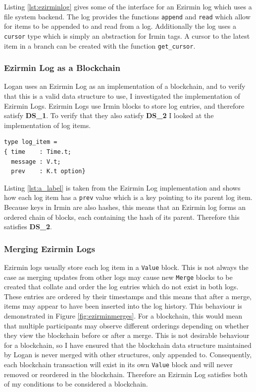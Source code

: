 \documentclass[12pt,a4paper,twoside,openright]{report}
\begin{document}
	Listing \ref{lst:ezirminlog} gives some of the interface for an Ezirmin log which uses a file system backend.
	The log provides the functions \texttt{append} and \texttt{read} which allow for items to be appended to and read from a log.
	Additionally the log uses a \texttt{cursor} type which is simply an abstraction for Irmin tags.
	A cursor to the latest item in a branch can be created with the function \texttt{get\_cursor}.

	\subsubsection*{Ezirmin Log as a Blockchain}
	Logan uses an Ezirmin Log as an implementation of a blockchain, and to verify that this is a valid data structure to use, I investigated the implementation of Ezirmin Logs.
	Ezirmin Logs use Irmin blocks to store log entries, and therefore satisfy \textbf{DS\_1}. 
	To verify that they also satisfy \textbf{DS\_2} I looked at the implementation of log items.\\

	\begin{lstlisting}[caption={Ezirmin Log Item},label={lst:a_label}]
type log_item =
{ time    : Time.t;
  message : V.t;
  prev    : K.t option}
	\end{lstlisting}

	Listing \ref{lst:a_label} is taken from the Ezirmin Log implementation and shows how each log item has a \texttt{prev} value which is a key pointing to its parent log item. 
	Because keys in Irmin are also hashes, this means that an Ezirmin log forms an ordered chain of blocks, each containing the hash of its parent. 
	Therefore this satisfies \textbf{DS\_2}.

	\subsubsection*{Merging Ezirmin Logs}
	Ezirmin logs usually store each log item in a \texttt{Value} block.
	This is not always the case as merging updates from other logs may cause new \texttt{Merge} blocks to be created that collate and order the log entries which do not exist in both logs.
	These entries are ordered by their timestamps and this means that after a merge, items may appear to have been inserted into the log history.
	This behaviour is demonstrated in Figure \ref{fig:ezirminmerges}.
	For a blockchain, this would mean that multiple participants may observe different orderings depending on whether they view the blockchain before or after a merge.
	This is not desirable behaviour for a blockchain, so I have ensured that the blockchain data structure maintained by Logan is never merged with other structures, only appended to. 
	Consequently, each blockchain transaction will exist in its own \texttt{Value} block and will never removed or reordered in the blockchain.
	Therefore an Ezirmin Log satisfies both of my conditions to be considered a blockchain.\\
\end{document}
